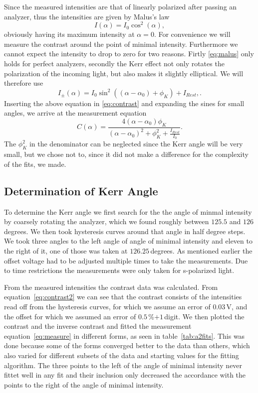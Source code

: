 \documentclass[a4paper,10pt]{scrartcl}
\begin{document}
Since the measured intensities are that of linearly polarized after passing an analyzer, thus the intensities are given by Malus's law
\begin{equation}
I(\alpha) = I_0 \cos^{2}(\alpha), \label{eq:malus}
\end{equation} 
obviously having its maximum intensity at $\alpha = 0$. For convenience we will measure the contrast around the point of minimal intensity. Furthermore we cannot expect the intensity to drop to zero for two reasons. Firtly \eqref{eq:malus} only holds for perfect analyzers, secondly the Kerr effect not only rotates the polarization of the incoming light, but also makes it slightly elliptical. We will therefore use
\begin{equation}
I_{\pm}(\alpha) = I_0 \sin^{2}\left((\alpha - \alpha_{0}) + \phi_{K}\right) + I_{Rest}, \label{eq:malus2}.
\end{equation} 
Inserting the above equation in \eqref{eq:contrast} and expanding the sines for small angles, we arrive at the measurement equation
\begin{equation}
C(\alpha) = \frac{4 (\alpha - \alpha_0) \phi_K}{(\alpha - \alpha_0)^2 + \phi^{2}_{K} + \frac{I_{Rest}}{I_0}}. \label{eq:measure}
\end{equation}
The $\phi^{2}_{K}$ in the denominator can be neglected since the Kerr angle will be very small, but we chose not to, since it did not make a difference for the complexity of the fits, we made.

\subsection{Determination of Kerr Angle \label{sec:kerrangle}}

To determine the Kerr angle we first search for the the angle of minmal intensity by coarsely rotating the analyzer, which we found roughly between $125.5$ and $126\,$degrees. We then took hysteresis curves around that angle in half degree steps. We took three angles to the left angle of angle of minimal intensity and eleven to the right of it, one of those was taken at $126.25\,$degrees. As mentioned earlier the offset voltage had to be adjusted multiple times to take the measurements. Due to time restrictions the measurements were only taken for s-polarized light.

From the measured intensities the contrast data was calculated. From equation~\eqref{eq:contrast2} we can see that the contrast consists of the intensities read off from the hysteresis curves, for which we assume an error of $0.03\,$V, and the offset for which we assumed an error of $0.5\,$\%$+1\,$digit. We then plotted the contrast and the inverse contrast and fitted the measurement equation~\eqref{eq:measure} in different forms, as seen in table~\ref{tab:a2fits}. This was done because some of the forms converged better to the data than others, which also varied for different subsets of the data and starting values for the fitting algorithm. The three points to the left of the angle of minimal intensity never fittet well in any fit and their inclusion only decreased the accordance with the points to the right of the angle of minimal intensity. 
\end{document}
